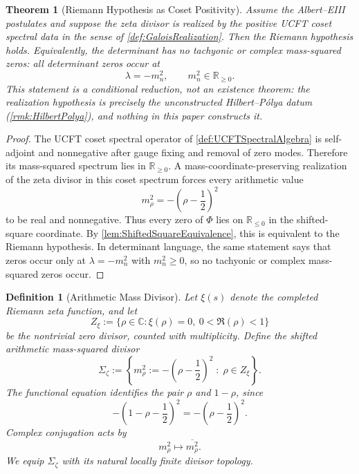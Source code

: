 \documentclass[pdflatex,sn-mathphys-num]{sn-jnl}
\theoremstyle{thmstyleone}
\newtheorem{theorem}{Theorem}
\theoremstyle{thmstylethree}%
\newtheorem{definition}[definition]{Definition}
\theoremstyle{thmstyletwo}%
\begin{document}
\begin{theorem}[Riemann Hypothesis as Coset Positivity]
\label{thm:NoTachyonRH}
Assume the Albert--EIII postulates and suppose the zeta divisor is realized by the
positive UCFT coset spectral data in the sense of
\autoref{def:GaloisRealization}. Then the Riemann hypothesis holds.
Equivalently, the determinant has no tachyonic or complex mass-squared zeros:
all determinant zeros occur at
\[
  \lambda=-m_n^2,
  \qquad
  m_n^2\in\mathbb R_{\ge0}.
\]
This statement is a conditional reduction, not an existence theorem: the
realization hypothesis is precisely the unconstructed Hilbert--P\'olya datum
(\autoref{rmk:HilbertPolya}), and nothing in this paper constructs it.
\end{theorem}

\begin{proof}
The UCFT coset spectral operator of \autoref{def:UCFTSpectralAlgebra} is
self-adjoint and nonnegative after gauge fixing and removal of zero modes.
Therefore its mass-squared spectrum lies in \(\mathbb R_{\ge0}\). A
mass-coordinate-preserving realization of the zeta divisor in this coset
spectrum forces every arithmetic value
\[
  m_\rho^2=-\left(\rho-\frac12\right)^2
\]
to be real and nonnegative. Thus every zero of \(\Phi\) lies on
\(\mathbb R_{\le0}\) in the shifted-square coordinate. By
\autoref{lem:ShiftedSquareEquivalence}, this is equivalent to the Riemann
hypothesis. In determinant language, the same statement says that zeros occur
only at \(\lambda=-m_n^2\) with \(m_n^2\ge0\), so no tachyonic or complex
mass-squared zeros occur.
\end{proof}

\begin{definition}[Arithmetic Mass Divisor]
\label{def:ArithmeticMassDivisor}
Let \(\xi(s)\) denote the completed Riemann zeta function, and let
\[
Z_{\xi}:=\{\rho\in\mathbb C:\xi(\rho)=0,\ 0<\Re(\rho)<1\}
\]
be the nontrivial zero divisor, counted with multiplicity. Define the shifted
arithmetic mass-squared divisor
\[
\Sigma_{\zeta}
:=
\left\{
m_{\rho}^{2}:= -\left(\rho-\frac12\right)^{2}
\;:\;
\rho\in Z_{\xi}
\right\}.
\]
The functional equation identifies the pair \(\rho\) and \(1-\rho\), since
\[
-\left(1-\rho-\frac12\right)^2
=
-\left(\rho-\frac12\right)^2.
\]
Complex conjugation acts by
\[
m_{\rho}^{2}\longmapsto \overline{m_{\rho}^{2}}.
\]
We equip \(\Sigma_{\zeta}\) with its natural locally finite divisor topology.
\end{definition}
\end{document}
